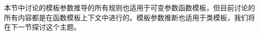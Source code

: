 本节中讨论的模板参数推导的所有规则也适用于可变参数函数模板，但目前讨论的所有内容都是在函数模板上下文中进行的。模板参数推断也适用于类模板，我们将在下一节探讨这个主题。














































